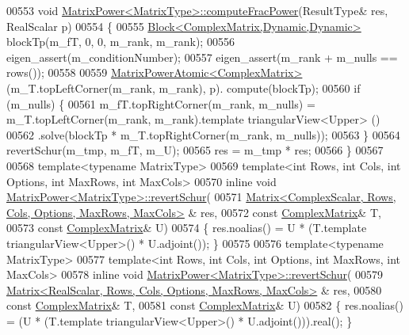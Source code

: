\begin{DoxyCode}
00553 \textcolor{keywordtype}{void} \hyperlink{class_eigen_1_1_matrix_power}{MatrixPower<MatrixType>::computeFracPower}(ResultType& res, 
      RealScalar p)
00554 \{
00555   \hyperlink{group___core___module_class_eigen_1_1_block}{Block<ComplexMatrix,Dynamic,Dynamic>} blockTp(m\_fT, 0, 0, m\_rank, 
      m\_rank);
00556   eigen\_assert(m\_conditionNumber);
00557   eigen\_assert(m\_rank + m\_nulls == rows());
00558 
00559   \hyperlink{class_eigen_1_1_matrix_power_atomic}{MatrixPowerAtomic<ComplexMatrix>}(m\_T.topLeftCorner(m\_rank, m\_rank), p).
      compute(blockTp);
00560   \textcolor{keywordflow}{if} (m\_nulls) \{
00561     m\_fT.topRightCorner(m\_rank, m\_nulls) = m\_T.topLeftCorner(m\_rank, m\_rank).template triangularView<Upper>
      ()
00562         .solve(blockTp * m\_T.topRightCorner(m\_rank, m\_nulls));
00563   \}
00564   revertSchur(m\_tmp, m\_fT, m\_U);
00565   res = m\_tmp * res;
00566 \}
00567 
00568 \textcolor{keyword}{template}<\textcolor{keyword}{typename} MatrixType>
00569 \textcolor{keyword}{template}<\textcolor{keywordtype}{int} Rows, \textcolor{keywordtype}{int} Cols, \textcolor{keywordtype}{int} Options, \textcolor{keywordtype}{int} MaxRows, \textcolor{keywordtype}{int} MaxCols>
00570 \textcolor{keyword}{inline} \textcolor{keywordtype}{void} \hyperlink{class_eigen_1_1_matrix_power}{MatrixPower<MatrixType>::revertSchur}(
00571     \hyperlink{group___core___module_class_eigen_1_1_matrix}{Matrix<ComplexScalar, Rows, Cols, Options, MaxRows, MaxCols>}
      & res,
00572     \textcolor{keyword}{const} \hyperlink{group___core___module}{ComplexMatrix}& T,
00573     \textcolor{keyword}{const} \hyperlink{group___core___module}{ComplexMatrix}& U)
00574 \{ res.noalias() = U * (T.template triangularView<Upper>() * U.adjoint()); \}
00575 
00576 \textcolor{keyword}{template}<\textcolor{keyword}{typename} MatrixType>
00577 \textcolor{keyword}{template}<\textcolor{keywordtype}{int} Rows, \textcolor{keywordtype}{int} Cols, \textcolor{keywordtype}{int} Options, \textcolor{keywordtype}{int} MaxRows, \textcolor{keywordtype}{int} MaxCols>
00578 \textcolor{keyword}{inline} \textcolor{keywordtype}{void} \hyperlink{class_eigen_1_1_matrix_power}{MatrixPower<MatrixType>::revertSchur}(
00579     \hyperlink{group___core___module_class_eigen_1_1_matrix}{Matrix<RealScalar, Rows, Cols, Options, MaxRows, MaxCols>}
      & res,
00580     \textcolor{keyword}{const} \hyperlink{group___core___module}{ComplexMatrix}& T,
00581     \textcolor{keyword}{const} \hyperlink{group___core___module}{ComplexMatrix}& U)
00582 \{ res.noalias() = (U * (T.template triangularView<Upper>() * U.adjoint())).real(); \}

\end{DoxyCode}
